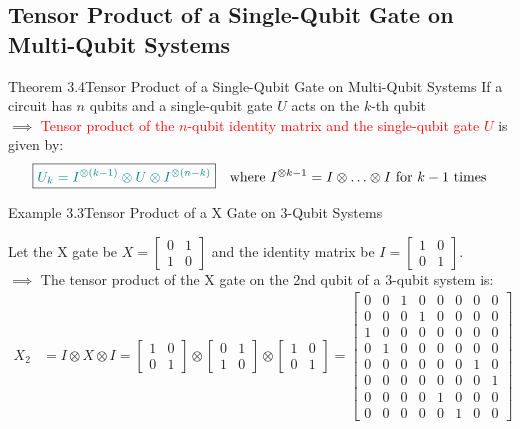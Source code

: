 \documentclass{book}
\begin{document}
\subsection{Tensor Product of a Single-Qubit Gate on Multi-Qubit Systems}
\begin{thmBox}{Theorem 3.4}{Tensor Product of a Single-Qubit Gate on Multi-Qubit Systems}
    If a circuit has $n$ qubits and a single-qubit gate $U$ acts on the $k$-th qubit\\
    $\implies$ \textcolor{red}{Tensor product of the $n$-qubit identity matrix and the single-qubit gate $U$} is given by:
    \[
        \boxed{\textcolor{teal}{U_k = I^{\otimes (k-1)} \otimes U \otimes I^{\otimes (n-k)}}} \quad \text{where } I^{\otimes k-1} = I \otimes \ldots \otimes I \text{ for } k-1 \text{ times}
    \]
\end{thmBox}
\begin{egBox}{Example 3.3}{Tensor Product of a X Gate on 3-Qubit Systems}
    \raggedright
    Let the X gate be $X = \begin{bmatrix} 0 & 1 \\ 1 & 0 \end{bmatrix}$ and the identity matrix be $I = \begin{bmatrix} 1 & 0 \\ 0 & 1 \end{bmatrix}$.\\
    $\implies$ The tensor product of the X gate on the 2nd qubit of a 3-qubit system is:
    \begin{align*}
        X_2 &= I \otimes X \otimes I = \begin{bmatrix} 1 & 0 \\ 0 & 1 \end{bmatrix} \otimes \begin{bmatrix} 0 & 1 \\ 1 & 0 \end{bmatrix} \otimes \begin{bmatrix} 1 & 0 \\ 0 & 1 \end{bmatrix} = \begin{bmatrix} 0 & 0 & 1 & 0 & 0 & 0 & 0 & 0 \\ 0 & 0 & 0 & 1 & 0 & 0 & 0 & 0 \\ 1 & 0 & 0 & 0 & 0 & 0 & 0 & 0 \\ 0 & 1 & 0 & 0 & 0 & 0 & 0 & 0 \\ 0 & 0 & 0 & 0 & 0 & 0 & 1 & 0 \\ 0 & 0 & 0 & 0 & 0 & 0 & 0 & 1 \\ 0 & 0 & 0 & 0 & 1 & 0 & 0 & 0 \\ 0 & 0 & 0 & 0 & 0 & 1 & 0 & 0 \end{bmatrix}
    \end{align*}
\end{egBox}
\end{document}
